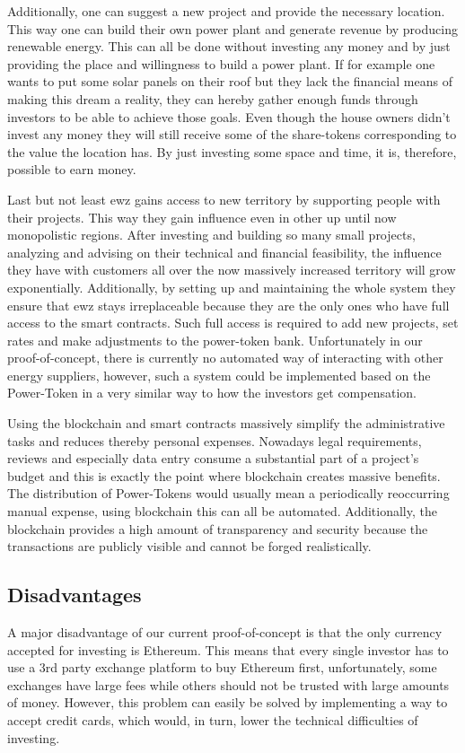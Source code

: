 Additionally, one can suggest a new project and provide the necessary location. This way one can build their own power plant and generate revenue by producing renewable energy. This can all be done without investing any money and by just providing the place and willingness to build a power plant. If for example one wants to put some solar panels on their roof but they lack the financial means of making this dream a reality, they can hereby gather enough funds through investors to be able to achieve those goals. Even though the house owners didn't invest any money they will still receive some of the share-tokens corresponding to the value the location has. By just investing some space and time, it is, therefore, possible to earn money.

Last but not least ewz gains access to new territory by supporting people with their projects. This way they gain influence even in other up until now monopolistic regions. After investing and building so many small projects, analyzing and advising on their technical and financial feasibility, the influence they have with customers all over the now massively increased territory will grow exponentially. Additionally, by setting up and maintaining the whole system they ensure that ewz stays irreplaceable because they are the only ones who have full access to the smart contracts. Such full access is required to add new projects, set rates and make adjustments to the power-token bank. Unfortunately in our proof-of-concept, there is currently no automated way of interacting with other energy suppliers, however, such a system could be implemented based on the Power-Token in a very similar way to how the investors get compensation.

Using the blockchain and smart contracts massively simplify the administrative tasks and reduces thereby personal expenses. Nowadays legal requirements, reviews and especially data entry consume a substantial part of a project's budget and this is exactly the point where blockchain creates massive benefits. The distribution of Power-Tokens would usually mean a periodically reoccurring manual expense, using blockchain this can all be automated. Additionally, the blockchain provides a high amount of transparency and security because the transactions are publicly visible and cannot be forged realistically.

\subsection{Disadvantages}
A major disadvantage of our current proof-of-concept is that the only currency accepted for investing is Ethereum. This means that every single investor has to use a 3rd party exchange platform to buy Ethereum first, unfortunately, some exchanges have large fees while others should not be trusted with large amounts of money. However, this problem can easily be solved by implementing a way to accept credit cards, which would, in turn, lower the technical difficulties of investing.

